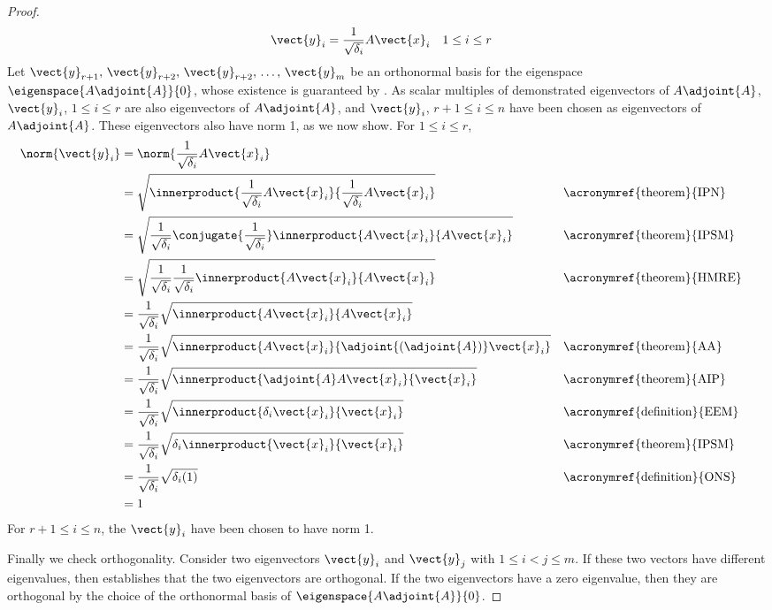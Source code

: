 \begin{proof}
%
\begin{align*}
\vect{y}_i&=\frac{1}{\sqrt{\delta_i}}A\vect{x}_i
&
1&\leq i\leq r
\end{align*}
%
Let $\vect{y}_{r+1},\,\vect{y}_{r+2},\,\vect{y}_{r+2},\,\dots,\,\vect{y}_{m}$ be an orthonormal basis for the eigenspace $\eigenspace{A\adjoint{A}}{0}$, whose existence is guaranteed by .  As scalar multiples of demonstrated eigenvectors of $A\adjoint{A}$, $\vect{y}_i$, $1\leq i\leq r$ are also eigenvectors of $A\adjoint{A}$, and $\vect{y}_i$, $r+1\leq i\leq n$ have been chosen as eigenvectors of $A\adjoint{A}$.  These eigenvectors also have norm 1, as we now show.  For $1\leq i\leq r$,
%
\begin{align*}
\norm{\vect{y}_i}&=
\norm{\frac{1}{\sqrt{\delta_i}}A\vect{x}_i}\\
%
&=\sqrt{\innerproduct{\frac{1}{\sqrt{\delta_i}}A\vect{x}_i}{\frac{1}{\sqrt{\delta_i}}A\vect{x}_i}}
&&\text{\acronymref{theorem}{IPN}}\\
%
&=\sqrt{\frac{1}{\sqrt{\delta_i}}\conjugate{\frac{1}{\sqrt{\delta_i}}}\innerproduct{A\vect{x}_i}{A\vect{x}_i}}
&&\text{\acronymref{theorem}{IPSM}}\\
%
&=\sqrt{\frac{1}{\sqrt{\delta_i}}\frac{1}{\sqrt{\delta_i}}\innerproduct{A\vect{x}_i}{A\vect{x}_i}}
&&\text{\acronymref{theorem}{HMRE}}\\
%
&=\frac{1}{\sqrt{\delta_i}}\sqrt{\innerproduct{A\vect{x}_i}{A\vect{x}_i}}\\
%
&=\frac{1}{\sqrt{\delta_i}}
\sqrt{\innerproduct{A\vect{x}_i}{\adjoint{\left(\adjoint{A}\right)}\vect{x}_i}}
&&\text{\acronymref{theorem}{AA}}\\
%
&=\frac{1}{\sqrt{\delta_i}}
\sqrt{\innerproduct{\adjoint{A}A\vect{x}_i}{\vect{x}_i}}
&&\text{\acronymref{theorem}{AIP}}\\
%
&=\frac{1}{\sqrt{\delta_i}}
\sqrt{\innerproduct{\delta_i\vect{x}_i}{\vect{x}_i}}
&&\text{\acronymref{definition}{EEM}}\\
%
&=\frac{1}{\sqrt{\delta_i}}
\sqrt{\delta_i\innerproduct{\vect{x}_i}{\vect{x}_i}}
&&\text{\acronymref{theorem}{IPSM}}\\
%
&=\frac{1}{\sqrt{\delta_i}}
\sqrt{\delta_i(1)}&&\text{\acronymref{definition}{ONS}}\\
%
&=1
%
\end{align*}
%
For $r+1\leq i\leq n$, the $\vect{y}_i$ have been chosen to have norm 1.\par
%
Finally we check orthogonality.  Consider two eigenvectors $\vect{y}_i$ and $\vect{y}_j$ with $1\leq i<j\leq m$.  If these two vectors have different eigenvalues, then  establishes that the two eigenvectors are orthogonal.  If the two eigenvectors have a zero eigenvalue, then they are orthogonal by the choice of the orthonormal basis of $\eigenspace{A\adjoint{A}}{0}$.

\end{proof}
